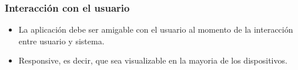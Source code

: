 \subsubsection{Interacción con el usuario}
\begin{itemize}
    \item La aplicación debe ser amigable con el usuario al momento de la interacción entre usuario y sistema.
    \item Responsive, es decir, que sea visualizable en la mayoria de los dispositivos.
\end{itemize}